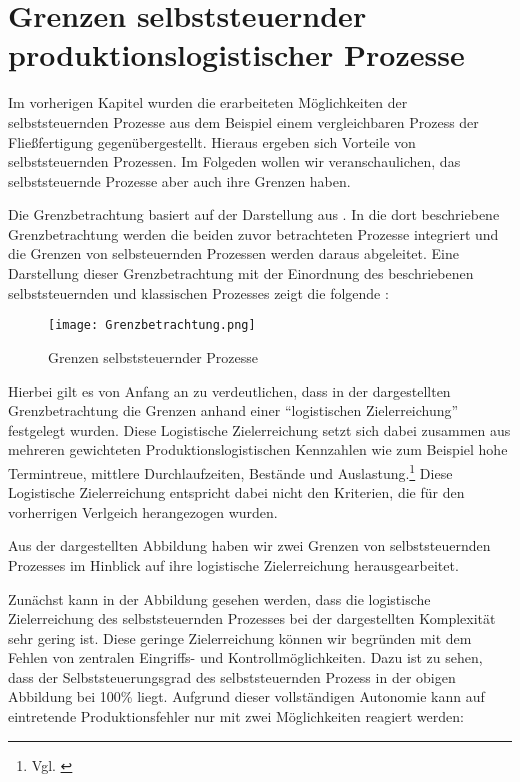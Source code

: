 \section{Grenzen selbststeuernder produktionslogistischer Prozesse}
\label{sec:Grenzen}

Im vorherigen Kapitel wurden die erarbeiteten Möglichkeiten der
selbststeuernden Prozesse aus dem Beispiel einem vergleichbaren Prozess der
Fließfertigung gegenübergestellt. Hieraus ergeben sich Vorteile von
selbststeuernden Prozessen. Im Folgeden wollen wir veranschaulichen,
das selbststeuernde Prozesse aber auch ihre Grenzen haben.

Die Grenzbetrachtung basiert auf der Darstellung aus \citet{evolution2007}.
In die dort beschriebene Grenzbetrachtung werden die beiden zuvor 
betrachteten Prozesse integriert und die Grenzen von selbsteuernden 
Prozessen werden daraus abgeleitet. Eine Darstellung dieser Grenzbetrachtung
mit der Einordnung des beschriebenen selbststeuernden und klassischen Prozesses
zeigt die folgende :

\begin{figure}[htb] 
\centering
\texttt{[image: Grenzbetrachtung.png]}
\caption[Grenzbetrachtung]{Grenzen selbststeuernder Prozesse\protect\footnotemark}
\label{fig:Grenzbetrachtung}
\end{figure}

Hierbei gilt es von Anfang an zu verdeutlichen, dass in der dargestellten
Grenzbetrachtung die Grenzen anhand einer "`logistischen Zielerreichung"'
festgelegt wurden. Diese Logistische Zielerreichung setzt sich dabei zusammen
aus mehreren gewichteten Produktionslogistischen Kennzahlen wie zum Beispiel
hohe Termintreue, mittlere Durchlaufzeiten, Bestände und Auslastung.\footnote{Vgl. \citet[S.~4]{evolution2007}}
Diese Logistische Zielerreichung entspricht dabei nicht den Kriterien,
die für den vorherrigen Verlgeich herangezogen wurden.

Aus der dargestellten Abbildung haben wir zwei Grenzen von selbststeuernden Prozesses
im Hinblick auf ihre logistische Zielerreichung herausgearbeitet.

Zunächst kann in der Abbildung gesehen werden, dass die logistische Zielerreichung
des selbststeuernden Prozesses bei der dargestellten Komplexität sehr gering ist.
Diese geringe Zielerreichung können wir begründen mit dem Fehlen von zentralen 
Eingriffs- und Kontrollmöglichkeiten. Dazu ist zu sehen, dass der Selbststeuerungsgrad
des selbststeuernden Prozess in der obigen Abbildung bei 100\% liegt. Aufgrund 
dieser vollständigen Autonomie kann auf eintretende Produktionsfehler nur mit zwei
Möglichkeiten reagiert werden:

